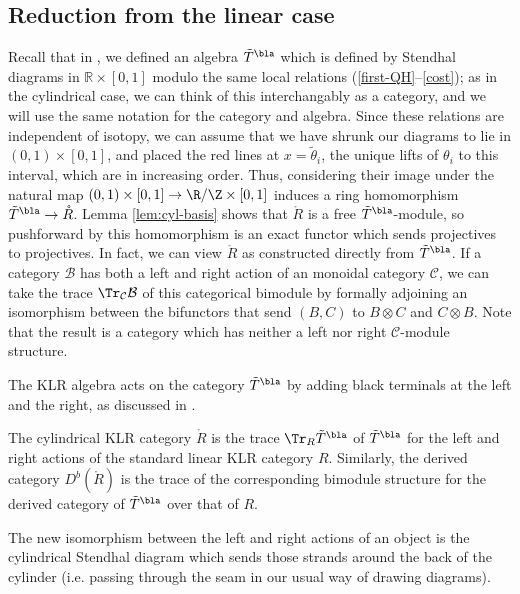 \subsection{Reduction from the linear case}
\label{sec:reduct-from-line}
Recall that in \cite[\S 4]{Webmerged}, we defined an algebra $\tilde{T}^{\bla}$ which is defined by Stendhal diagrams in $\mathbb{R}\times [0,1]$ modulo the same local relations (\ref{first-QH}--\ref{cost}); as in the cylindrical case, we can think of this interchangably as a category, and we will use the same notation for the category and algebra.  Since these relations are independent of isotopy, we can assume that we have shrunk our diagrams to lie in $(0,1)\times [0,1]$, and placed the red lines at $x=\tilde{\theta}_i$, the unique lifts of $\theta_i$ to this interval, which are in increasing order.  Thus, considering their image under the natural map $ (0,1)\times [0,1]\to \R/\Z\times [0,1]$ induces a ring homomorphism $\tilde{T}^{\bla}\to \mathring{R}$.  
Lemma \ref{lem:cyl-basis} shows that $\mathring{R}$ is a free $\tilde{T}^{\bla}$-module, so pushforward by this homomorphism is an exact functor which sends projectives to projectives.  In fact, we can view $\mathring{R}$ as constructed directly from $\tilde{T}^{\bla}$.  If a category $\mathcal{B}$ has both a left and right action of an monoidal category $\mathcal{C}$, we can take the trace $\Tr_{\mathcal{C}}\mathcal{B}$ of this categorical bimodule by formally adjoining an isomorphism between the bifunctors that send $(B,C)$ to $B\otimes C$ and $C\otimes B$.  Note that the result is a category which has neither a left nor right $ \mathcal{C}$-module structure.

The KLR algebra acts on the category $\tilde{T}^{\bla}$ by adding black terminals at the left and the right, as discussed in \cite[\S 2.2.3]{Webweb}.
\begin{proposition}
The cylindrical KLR category $\mathring{R}$ is the trace $\Tr_{R}\tilde{T}^{\bla}$ of $\tilde{T}^{\bla}$ for the left and right actions of the standard linear KLR category $R$.  Similarly, the derived category $D^b(\mathring{R})$ is the trace of the corresponding bimodule structure for the derived category of $\tilde{T}^{\bla}$ over that of $R$. 
\end{proposition}
 The new isomorphism between the left and right actions of an object is the cylindrical Stendhal diagram which sends those strands around the back of the cylinder (i.e. passing through the seam in our usual way of drawing diagrams).  


